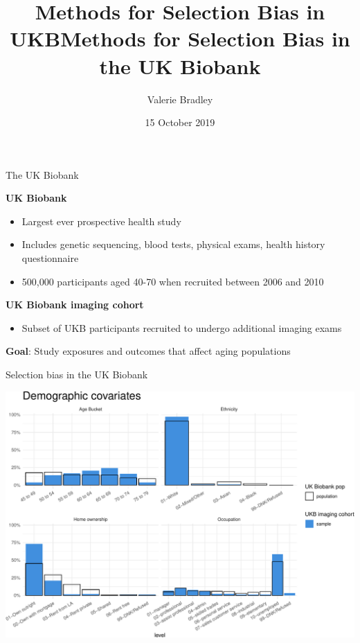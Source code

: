 \documentclass[
  ignorenonframetext,
]{beamer}
\title[Methods for Selection Bias in the UK Biobank]{Methods for Selection Bias in UKB}
\institute[University of Oxford]{University of Oxford, Department of Statistics}
\title{Methods for Selection Bias in the UK Biobank}
\author{Valerie Bradley}
\date{15 October 2019}
\providecommand{\tightlist}{%
  \setlength{\itemsep}{0pt}\setlength{\parskip}{0pt}}
\begin{document}
\frame{\titlepage}

\begin{frame}{The UK Biobank}
\protect\hypertarget{the-uk-biobank}{}

\textbf{UK Biobank}

\begin{itemize}
\tightlist
\item
  Largest ever prospective health study
\item
  Includes genetic sequencing, blood tests, physical exams, health
  history questionnaire
\item
  500,000 participants aged 40-70 when recruited between 2006 and 2010
\end{itemize}

\textbf{UK Biobank imaging cohort}

\begin{itemize}
\tightlist
\item
  Subset of UKB participants recruited to undergo additional imaging
  exams
\end{itemize}

\textbf{Goal}: Study exposures and outcomes that affect aging
populations

\end{frame}

\begin{frame}{Selection bias in the UK Biobank}
\protect\hypertarget{selection-bias-in-the-uk-biobank}{}

\begin{center}\includegraphics[width=0.96\linewidth]{fmrib-deck-20191002_files/figure-beamer/plot-selection-bias-demos-1} \end{center}

\end{frame}
\end{document}

